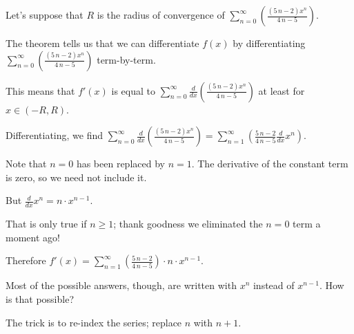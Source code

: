 \documentclass{ximera}
\begin{document}
\begin{question}
  \begin{solution}
    \begin{hint}
      Let's suppose that \(R\) is the radius of convergence of \(\displaystyle\sum_{n=0}^\infty \left( \displaystyle\frac{{\left(5 \, n - 2\right)} x^{n}}{4 \, n - 5} \right)\).
    \end{hint}
    \begin{hint}
      The theorem tells us that we can differentiate \(f(x)\) by differentiating \(\displaystyle\sum_{n=0}^\infty \left( \displaystyle\frac{{\left(5 \, n - 2\right)} x^{n}}{4 \, n - 5} \right)\) term-by-term.
    \end{hint}
    \begin{hint}
      This means that \(f'(x)\) is equal to \(\displaystyle\sum_{n=0}^\infty \displaystyle\frac{d}{dx} \left( \displaystyle\frac{{\left(5 \, n - 2\right)} x^{n}}{4 \, n - 5} \right)\) at least for \(x \in (-R,R)\).
    \end{hint}
    \begin{hint}
      Differentiating, we find \(\displaystyle\sum_{n=0}^\infty \displaystyle\frac{d}{dx} \left( \displaystyle\frac{{\left(5 \, n - 2\right)} x^{n}}{4 \, n - 5} \right) = 
      \displaystyle\sum_{n=1}^\infty \left( \displaystyle\frac{5 \, n - 2}{4 \, n - 5} \displaystyle\frac{d}{dx} x^{n} \right)\).
    \end{hint}
    \begin{hint}
      Note that \(n=0\) has been replaced by \(n=1\).  The derivative of the constant term is zero, so we need not include it.
    \end{hint}
    \begin{hint}
      But \(\displaystyle\frac{d}{dx} x^{n} = n \cdot x^{n-1}\).
    \end{hint}
    \begin{hint}
      That is only true if \(n \geq 1\); thank goodness we eliminated the \(n=0\) term a moment ago!
    \end{hint}
    \begin{hint}
      Therefore \(f'(x) = \displaystyle\sum_{n=1}^\infty \left( \displaystyle\frac{5 \, n - 2}{4 \, n - 5} \right) \cdot n \cdot x^{n-1} \).
    \end{hint}
    \begin{hint}
      Most of the possible answers, though, are written with \(x^{n}\) instead of \(x^{n-1}\).  How is that possible?
    \end{hint}
    \begin{hint}
      The trick is to re-index the series; replace \(n\) with \(n+1\).

\end{hint}
\end{solution}
\end{question}
\end{document}
